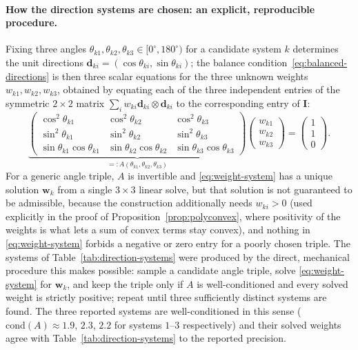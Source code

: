 \documentclass[10pt,a4paper]{article}
\begin{document}
\paragraph{How the direction systems are chosen: an explicit,
reproducible procedure.}
\label{sec:direction-selection}
Fixing three angles $\theta_{k1},\theta_{k2},\theta_{k3}\in[0^\circ,180^\circ)$
for a candidate system $k$ determines the unit directions
$\bm d_{ki}=(\cos\theta_{ki},\sin\theta_{ki})$; the balance
condition~\eqref{eq:balanced-directions} is then three scalar equations
for the three unknown weights $w_{k1},w_{k2},w_{k3}$, obtained by
equating each of the three independent entries of the symmetric
$2\times2$ matrix $\sum_iw_{ki}\bm d_{ki}\otimes \bm d_{ki}$ to the
corresponding entry of $\bm I$:
\begin{equation}
 \underbrace{\begin{pmatrix}
 \cos^2\theta_{k1}&\cos^2\theta_{k2}&\cos^2\theta_{k3}\\
 \sin^2\theta_{k1}&\sin^2\theta_{k2}&\sin^2\theta_{k3}\\
 \sin\theta_{k1}\cos\theta_{k1}&\sin\theta_{k2}\cos\theta_{k2}&\sin\theta_{k3}\cos\theta_{k3}
 \end{pmatrix}}_{=:A(\theta_{k1},\theta_{k2},\theta_{k3})}
 \begin{pmatrix}w_{k1}\\w_{k2}\\w_{k3}\end{pmatrix}
 =\begin{pmatrix}1\\1\\0\end{pmatrix}.
 \label{eq:weight-system}
\end{equation}
For a generic angle triple, $A$ is invertible and
\eqref{eq:weight-system} has a unique solution $\bm w_k$ from a single
$3\times3$ linear solve, but that solution is not guaranteed to be
admissible, because the construction additionally needs $w_{ki}>0$ (used
explicitly in the proof of Proposition~\ref{prop:polyconvex}, where
positivity of the weights is what lets a sum of convex terms stay
convex), and nothing in \eqref{eq:weight-system} forbids a negative or
zero entry for a poorly chosen triple. The systems of
Table~\ref{tab:direction-systems} were produced by the direct,
mechanical procedure this makes possible: sample a candidate angle
triple, solve \eqref{eq:weight-system} for $\bm w_k$, and keep the
triple only if $A$ is well-conditioned and every solved weight is
strictly positive; repeat until three sufficiently distinct systems are
found. The three reported systems are well-conditioned in this sense
($\mathrm{cond}(A)\approx1.9$, $2.3$, $2.2$ for systems $1$--$3$
respectively) and their solved weights agree with
Table~\ref{tab:direction-systems} to the reported precision.
\end{document}
